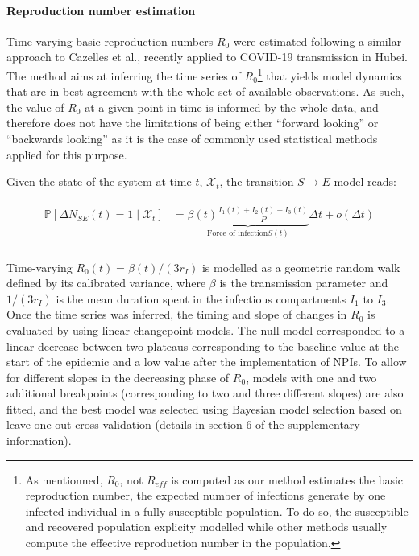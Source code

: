  \paragraph{Reproduction number estimation} Time-varying basic reproduction numbers $R_0$ were estimated following a similar approach to Cazelles et al.\cite{Cazelles:AccountingNonstationarityEpidemiology:2018}, recently applied to COVID-19 transmission in Hubei\cite{Kucharski:EarlyDynamicsTransmission:2020}. The method aims at inferring the time series of $R_0$\footnote{As mentionned, $R_0$, not $R_{eff}$ is computed as our method estimates the basic reproduction number, \ie the expected number of infections generate by one infected individual in a fully susceptible population. To do so, the susceptible and recovered population explicity modelled  while other methods usually compute the effective reproduction number in the population.} that yields model dynamics that are in best agreement with the whole set of available observations. As such, the value of $R_0$ at a given point in time is informed by the whole data, and therefore does not have the limitations of being either “forward looking” or “backwards looking” as it is the case of commonly used statistical methods applied for this purpose\cite{Wallinga:DifferentEpidemicCurves:2004,Cori:NewFrameworkSoftware:2013,Lipsitch:CommentPanLiu:2020}. 
 
Given the state of the system at time \(t\), \(\mathcal{X}_t\), the transition $S \longrightarrow E$ model reads:

\begin{gather}
\begin{aligned}
    \mathbb{P}\left[ \Delta N_{SE}(t) = 1 \mid\mathcal{X}_t\right] &=  \underbrace{\beta(t)  \frac{I_1(t) + I_2(t) + I_3(t)}{P}}_{\text{Force of infection} S(t)} \Delta t + o(\Delta t)\\
    \end{aligned}
\end{gather}

Time-varying $R_0(t) = \beta(t)/(3r_I)$ is modelled as a geometric random walk defined by its calibrated variance, where $\beta$ is the transmission parameter and $1/(3r_I)$ is the mean duration spent in the infectious compartments $I_1$ to $I_3$. Once the time series was inferred, the timing and slope of changes in $R_0$ is evaluated by using linear changepoint models\cite{Lindelov:McpPackageRegression:2020}. The null model corresponded to a linear decrease between two plateaus corresponding to the baseline value at the start of the epidemic and a low value after the implementation of NPIs. To allow for different slopes in the decreasing phase of $R_0$, models with one and two additional breakpoints (corresponding to two and three different slopes) are also fitted, and the best model was selected using Bayesian model selection based on leave-one-out cross-validation (details in section 6 of the supplementary information). 

